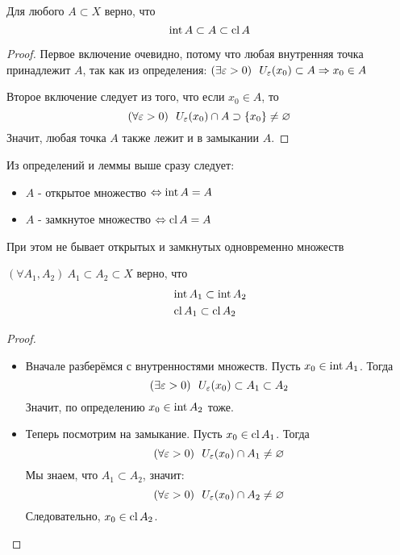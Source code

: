 \begin{lemma}
	Для любого $A \subset X$ верно, что
	\[
		\operatorname{int} A \subset A \subset \operatorname{cl} A
	\]
\end{lemma}

\begin{proof}
	Первое включение очевидно, потому что любая
	внутренняя точка принадлежит $A$, так как из
	определения: 
	$(\exists \varepsilon > 0)\ \ U_\varepsilon(x_0) \subset A \Rightarrow
	x_0 \in A$
	
	Второе включение следует из того, что если
	$x_0 \in A$, то
	\[
		(\forall \varepsilon > 0)\ \ U_\varepsilon(x_0) \cap
		A \supset \{x_0\} \neq \varnothing
	\]
	Значит, любая точка $A$ также лежит и в замыкании $A$.
\end{proof}

\begin{corollary} \label{defEqualLemma}
	Из определений и леммы выше сразу следует:
	\begin{itemize}
		\item $A$ - открытое множество $\Leftrightarrow \operatorname{int} A = A$
	
		\item $A$ - замкнутое множество $\Leftrightarrow \operatorname{cl} A = A$ 
	\end{itemize}
	При этом не бывает открытых и замкнутых одновременно множеств
\end{corollary}

\begin{lemma} \label{includeLemma}
	$(\forall A_1, A_2)\ A_1 \subset A_2 \subset X$ верно, что
	\begin{align*}
		&\operatorname{int} A_1 \subset \operatorname{int} A_2
		\\
		&\operatorname{cl} A_1 \subset \operatorname{cl} A_2
	\end{align*}
\end{lemma}

\begin{proof}~
	\begin{itemize}
		\item Вначале разберёмся с внутренностями
		множеств. Пусть $x_0 \in \operatorname{int} A_1$. Тогда
		\[
			(\exists \varepsilon > 0)\ \ U_\varepsilon(x_0)
			\subset A_1 \subset A_2
		\]
		Значит, по определению $x_0 \in \operatorname{int} A_2$ тоже.
		
		\item Теперь посмотрим на замыкание.
		Пусть $x_0 \in \operatorname{cl} A_1$. Тогда
		\[
			(\forall \varepsilon > 0)\ \ U_\varepsilon(x_0) \cap
			A_1 \neq \varnothing
		\]
		Мы знаем, что $A_1 \subset A_2$, значит:
		\[
			(\forall \eps > 0)\ \ U_\eps(x_0) \cap
			A_2 \neq \emptyset
		\]
		Следовательно, $x_0 \in \operatorname{cl} A_2$.
	\end{itemize}
\end{proof}

